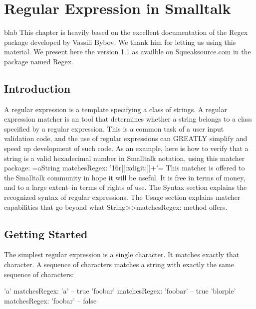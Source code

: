 \documentclass[a4paper,10pt,twoside]{book}
\begin{document}
\fi
\sloppy
\chapter{Regular Expression in Smalltalk}\label{cha:basic}


blab
This chapter is heavily based on the excellent documentation of the Regex package developed by Vassili Bybov. We thank him for letting us using this material. We present here the version 1.1 as availble on Squeaksource.com in the package named Regex. 



\section{Introduction}
A regular expression is a template specifying a class of strings. A regular 
expression matcher is an tool that determines whether a string 
belongs to a class specified by a regular expression.  This is a 
common task of a user input validation code, and the use of regular 
expressions can GREATLY simplify and speed up development of such code.  As an example, here is how to verify that a string is a valid hexadecimal number in 
Smalltalk notation, using this matcher package: \ct=aString matchesRegex: '16r[[:xdigit:]]+'=
 This matcher is offered to the Smalltalk community in hope it will be useful.
 It is free in terms of money, and to a large extent--in terms of rights of use.
 The Syntax section explains the recognized syntax of regular expressions. The 
Usage section explains matcher capabilities that go beyond what 
String>>matchesRegex: method offers.



\section{Getting Started}
The simplest regular expression is a single character.  It matches exactly that character. A sequence of characters matches a string with exactly the same sequence of characters:

\begin{code}{} 	
'a' matchesRegex: 'a'				-- true 
'foobar' matchesRegex: 'foobar'		-- true 
'blorple' matchesRegex: 'foobar'		-- false
\end{code}
\end{document}
